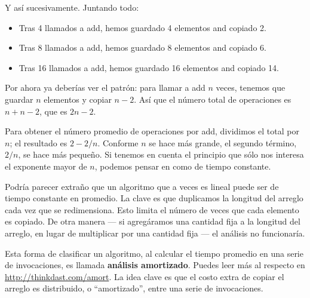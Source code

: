 \documentclass[12pt]{book}
\theoremstyle{exercise}
\begin{document}
Y así sucesivamente. Juntando todo:

\begin{itemize}

\item
  Tras 4 llamados a add, hemos guardado 4 elementos and copiado 2.

\item
  Tras 8 llamados a add, hemos guardado 8 elementos and copiado 6.

\item
  Tras 16 llamados a add, hemos guardado 16 elementos and copiado 14.

\end{itemize}

Por ahora ya deberías ver el patrón: para llamar a add $n$ veces, tenemos
que guardar $n$ elementos y copiar $n-2$. Así que el número total de
operaciones es $n + n - 2$, que es $2n-2$.

Para obtener el número promedio de operaciones por add, dividimos el total por
$n$; el resultado es $2 - 2/n$. Conforme $n$ se hace más grande, el
segundo término, $2/n$, se hace más pequeño. Si tenemos en cuenta el principio que
sólo nos interesa el exponente mayor de $n$, podemos pensar en
 como de tiempo constante.


Podría parecer extraño que un algoritmo que a veces es lineal puede ser de
tiempo constante en promedio. La clave es que duplicamos la longitud del
arreglo cada vez que se redimensiona. Esto limita el número de veces que
cada elemento es copiado. De otra manera --- si agregáramos una cantidad
fija a la longitud del arreglo, en lugar de multiplicar por una cantidad fija --- el
análisis no funcionaría.




Esta forma de clasificar un algoritmo, al calcular el tiempo promedio en una
serie de invocaciones, es llamada {\bf análisis amortizado}.  Puedes
leer más al respecto en
\url{http://thinkdast.com/amort}. 
La idea clave es que el costo extra de copiar el arreglo es distribuido,
o ``amortizado'', entre una serie de invocaciones.
\end{document}
